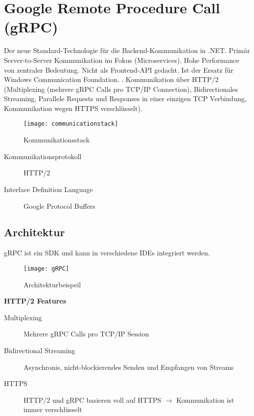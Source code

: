 \section{Google Remote Procedure Call (gRPC)}
Der neue Standard-Technologie für die Backend-Kommunikation in .NET. Primär Server-to-Server Kommunikation im Fokus (Microservices). Hohe Performance von zentraler Bedeutung. Nicht als Frontend-API gedacht. Ist der Ersatz für Windows Communication Foundation. . Kommunikation über HTTP/2 (Multiplexing (mehrere gRPC Calls pro TCP/IP Connection), Bidirectionales Streaming, Parallele Requests und Responses in einer einzigen TCP Verbindung, Kommunikation wegen HTTPS verschlüsselt).

\begin{figure}[h!]
  	\centering
  	\texttt{[image: communicationstack]}
  \caption{Kommunikationsstack}
\end{figure}

\begin{description}
  \item[Kommunikationsprotokoll] HTTP/2
  \item[Interface Definition Language] Google Protocol Buffers
\end{description}

\subsection{Architektur}
gRPC ist ein SDK und kann in verschiedene IDEs integriert werden. 

\begin{figure}[h!]
	\centering
	\texttt{[image: gRPC]}
 	\caption{Architekturbeispeil}
\end{figure}



\textbf{HTTP/2 Features}
\begin{description}
  \item[Multiplexing] Mehrere gRPC Calls pro TCP/IP Session
  \item[Bidirectional Streaming] Asynchronis, nicht-blockierendes Senden und Empfangen von Streams
  \item[HTTPS] HTTP/2 und gRPC basieren voll auf HTTPS $\rightarrow$ Kommunikation ist immer verschlüsselt
\end{description}

